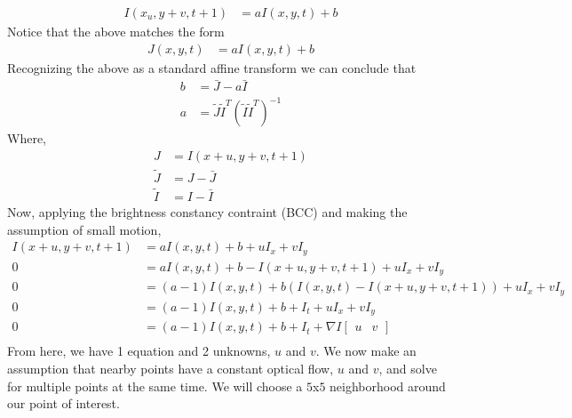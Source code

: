 \begin{align*}
I(x_u, y+v, t+ 1) &= a I(x,y,t) + b
\end{align*}
Notice that the above matches the form
\begin{align*}
J(x,y,t) &= a I(x,y,t) + b
\end{align*}
Recognizing the above as a standard affine transform we can conclude that
\begin{align*}
b &= \bar{J} - a \bar{I}\\
a &= \tilde{J}\tilde{I}^T(\tilde{I}\tilde{I}^T)^{-1}
\end{align*}
Where,
\begin{align*}
J &= I(x+u, y+v, t+1)\\
\tilde{J} &= J - \bar{J}\\
\tilde{I} &= I - \bar{I}
\end{align*}
Now, applying the brightness constancy contraint (BCC) and making the assumption of small motion,
\begin{align*}
I(x+u,y+v,t+1) &= aI(x, y, t) +b + uI_x + vI_y \\
0 &= aI(x,y,t) + b - I(x+u, y+v,t+1) + uI_x + vI_y \\
0 &= (a-1)I(x, y, t) + b (I(x, y, t) - I(x+u,y+v,t+1)) + uI_x + vI_y \\
0 &= (a-1)I(x, y, t) + b + I_t + uI_x + vI_y\\
0 &= (a-1)I(x, y, t) + b + I_t + \nabla I \begin{bmatrix} u & v \end{bmatrix} \\
\end{align*}
From here, we have 1 equation and 2 unknowns, $u$ and $v$. We now make an assumption that nearby points have a constant optical flow, $u$ and $v$, and solve for multiple points at the same time. We will choose a $5$x$5$ neighborhood around our point of interest.
